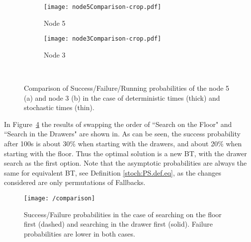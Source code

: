 \begin{figure}[h]
\centering
        \begin{subfigure}[h]{0.8\columnwidth}
                \centering
                \texttt{[image: node5Comparison-crop.pdf]}
                \caption{Node 5}
                 \vspace{0.3cm}
                \label{stoch:res.fig.5compar}
        \end{subfigure}%
        \vspace{0.1cm}
        \begin{subfigure}[h]{0.8\columnwidth}
                \centering
                \texttt{[image: node3Comparison-crop.pdf]}
                \caption{Node 3}   
                \label{stoch:res.fig.3compar}           
        \end{subfigure}
        ~ %
        \caption{Comparison of Success/Failure/Running probabilities of the node 5 (a) and node 3 (b) in the case of deterministic times (thick) and stochastic times (thin).}
        \label{stoch:res.fig.35det}
\end{figure}



In Figure~\ref{stoch:res.fig.comparison}
the results of swapping the order of ``Search on the Floor" and ``Search in the Drawers" are shown in.
As can be seen, the success probability after 100s is about 30\% when starting with the drawers, and about 20\% when starting with the floor.
Thus the optimal solution is a new BT, with the drawer search as the first option.
Note that
the asymptotic probabilities are always the same for equivalent BT, see Definition \ref{stoch:PS.def.eq}, as the  changes considered are only permutations of Fallbacks.
 


\begin{figure}[h]
\centering
\texttt{[image: /comparison]}
\caption{Success/Failure probabilities in the case of searching on the floor first (dashed) and searching in the drawer first (solid). Failure probabilities are lower in both cases.}
\label{stoch:res.fig.comparison}
\end{figure}
